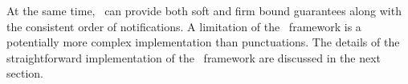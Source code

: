 At the same time, \tracker\ can provide both soft and firm bound guarantees along with the consistent order of notifications. A limitation of the \tracker\ framework is a potentially more complex implementation than punctuations. The details of the straightforward implementation of the \tracker\ framework are discussed in the next section.
